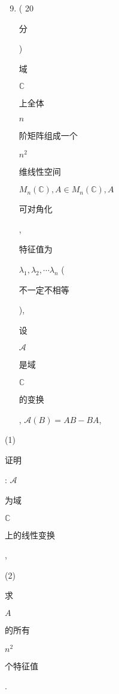 \documentclass[10pt]{article}
\begin{document}
\begin{enumerate}
  \setcounter{enumi}{8}
  \item ( 20 \begin{CJK}{UTF8}{mj}分\end{CJK}) \begin{CJK}{UTF8}{mj}域\end{CJK} $\mathbb{C}$ \begin{CJK}{UTF8}{mj}上全体\end{CJK} $n$ \begin{CJK}{UTF8}{mj}阶矩阵组成一个\end{CJK} $n^{2}$ \begin{CJK}{UTF8}{mj}维线性空间\end{CJK} $M_{n}(\mathbb{C}), A \in M_{n}(\mathbb{C}), A$ \begin{CJK}{UTF8}{mj}可对角化\end{CJK}, \begin{CJK}{UTF8}{mj}特征值为\end{CJK} $\lambda_{1}, \lambda_{2}, \cdots \lambda_{n}$ (\begin{CJK}{UTF8}{mj}不一定不相等\end{CJK}), \begin{CJK}{UTF8}{mj}设\end{CJK} $\mathcal{A}$ \begin{CJK}{UTF8}{mj}是域\end{CJK} $\mathbb{C}$ \begin{CJK}{UTF8}{mj}的变换\end{CJK}, $\mathcal{A}(B)=A B-B A$,
\end{enumerate}
(1) \begin{CJK}{UTF8}{mj}证明\end{CJK}: $\mathcal{A}$ \begin{CJK}{UTF8}{mj}为域\end{CJK} $\mathbb{C}$ \begin{CJK}{UTF8}{mj}上的线性变换\end{CJK},

(2) \begin{CJK}{UTF8}{mj}求\end{CJK} $A$ \begin{CJK}{UTF8}{mj}的所有\end{CJK} $n^{2}$ \begin{CJK}{UTF8}{mj}个特征值\end{CJK}.
\end{document}
